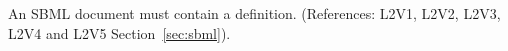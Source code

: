 An SBML document must contain a \Model definition.  (References:
L2V1, L2V2, L2V3, L2V4 and L2V5 Section~\ref{sec:sbml}).
